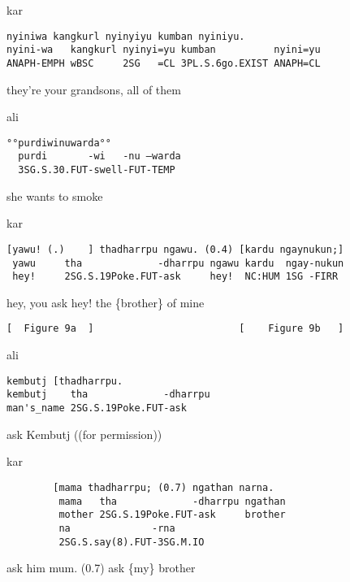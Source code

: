 \documentclass[output=paper,nonflat,colorlinks,citecolor=brown]{langsci/langscibook}
\begin{document}
\vspace{2mm}
%
\begin{transbox}{1}{kar}
\begin{verbatim}
nyiniwa kangkurl nyinyiyu kumban nyiniyu.
nyini-wa   kangkurl nyinyi=yu kumban          nyini=yu
ANAPH-EMPH wBSC     2SG   =CL 3PL.S.6go.EXIST ANAPH=CL
\end{verbatim}
they're your grandsons, all of them
\end{transbox}
%
%
\begin{mdframednoverticalspace}[style=firstfoc]
\begin{transbox}{3}{ali}
\begin{verbatim}
°°purdiwinuwarda°°
  purdi       -wi   -nu –warda
  3SG.S.30.FUT-swell-FUT-TEMP
\end{verbatim}
\hspace{0.14cm} she wants to smoke
\end{transbox}
\end{mdframednoverticalspace}
%
\begin{mdframednoverticalspace}[style=secondfoc]
\begin{transbox}{5}{kar}
\begin{verbatim}
[yawu! (.)    ] thadharrpu ngawu. (0.4) [kardu ngaynukun;]
 yawu     tha             -dharrpu ngawu kardu  ngay-nukun
 hey!     2SG.S.19Poke.FUT-ask     hey!  NC:HUM 1SG -FIRR
\end{verbatim}
\hspace{0.07cm} hey, you ask hey! the \{brother\} of mine
\end{transbox}
\end{mdframednoverticalspace}
%
\begin{mdframednoverticalspace}[style=secondfoc]
\begin{transbox}{6}{\fig}
\begin{verbatim}
[  Figure 9a  ]                         [    Figure 9b   ]
\end{verbatim}
\end{transbox}
\end{mdframednoverticalspace}
%
%
\begin{transbox}{8}{ali}
\begin{verbatim}
kembutj [thadharrpu.
kembutj    tha             -dharrpu
man's_name 2SG.S.19Poke.FUT-ask
\end{verbatim}
ask Kembutj ((for permission))
\end{transbox}
%
\begin{transbox}{9}{kar}
\begin{verbatim}
        [mama thadharrpu; (0.7) ngathan narna.
         mama   tha             -dharrpu ngathan 
         mother 2SG.S.19Poke.FUT-ask     brother
         na              -rna
         2SG.S.say(8).FUT-3SG.M.IO
\end{verbatim}
\hspace{1.25cm} ask him mum. (0.7) ask \{my\} brother
\end{transbox}
\end{document}
